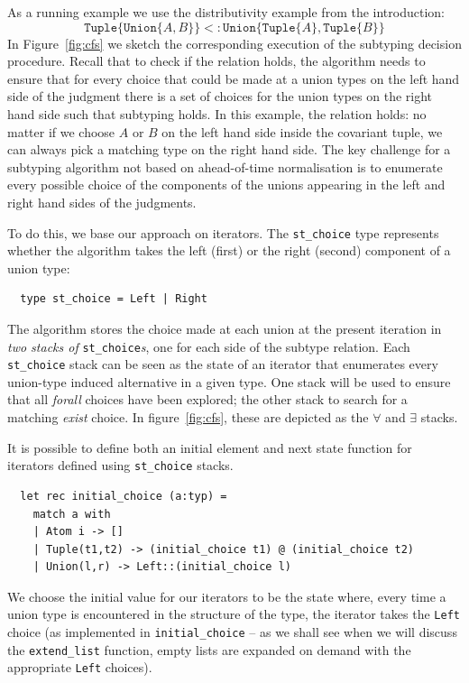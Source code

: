 \documentclass[a4paper,english]{lipics-v2019}
\newcommand{\xt}[1]{\texttt{#1}}
\newcommand{\union}[2]{\xt{Union\{}#1,#2\xt{\}}}
\newcommand{\tuple}[1]{\xt{Tuple\{}#1\xt{\}}}
\begin{document}
As a running example we use the distributivity example from the
introduction:
$$\tuple{\union{A}{B}} <: \union{\tuple{A}}{\tuple{B}}$$
In Figure~\ref{fig:cfs} we sketch the corresponding
execution of the subtyping decision procedure.  Recall that to check
if the relation holds, the algorithm needs to ensure that for every choice 
that could be made at a union types on the left hand side of the
judgment there is a set of choices for the union types on the right hand
side such that subtyping holds. In this example, the relation holds: no
matter if we choose $A$ or $B$ on the left hand side inside the
covariant tuple, we can always pick a matching type on the right hand
side. The key challenge for a subtyping algorithm not based on
ahead-of-time normalisation is to enumerate
every possible choice of the components of the unions appearing in the
left and right hand sides of the judgments.

To do this, we base our approach on iterators. The \verb|st_choice|
type represents whether the algorithm takes the left (first) or the
right (second)
component of a union type:
\begin{small}
\begin{verbatim}
  type st_choice = Left | Right
\end{verbatim}
\end{small}
The algorithm stores
the choice made at each union at the present iteration in \emph{two stacks of}
\verb|st_choice|\emph{s}, one for each side of the subtype relation. 
Each \verb|st_choice| stack can be seen as the state of an iterator that
enumerates every union-type induced alternative in a given type.  One
stack will be used to ensure that all \emph{forall} choices have been
explored; the other stack to search for a matching \emph{exist} choice.
In figure~\ref{fig:cfs}, these are depicted as the $\forall$ and $\exists$ stacks.

It is possible to define both an initial element and next state function for
iterators defined using \verb|st_choice| stacks.

\begin{small}
\begin{verbatim}
  let rec initial_choice (a:typ) = 
    match a with
    | Atom i -> []
    | Tuple(t1,t2) -> (initial_choice t1) @ (initial_choice t2)
    | Union(l,r) -> Left::(initial_choice l)
\end{verbatim}
\end{small}
We choose the initial value for our iterators to be the state where, every
time a union type is encountered in the structure of the type, the iterator
takes the \verb+Left+ choice (as implemented in \verb|initial_choice|
-- as we shall see when we will discuss the \verb+extend_list+
function, empty lists are expanded on demand with the appropriate
\verb+Left+ choices).
\end{document}
